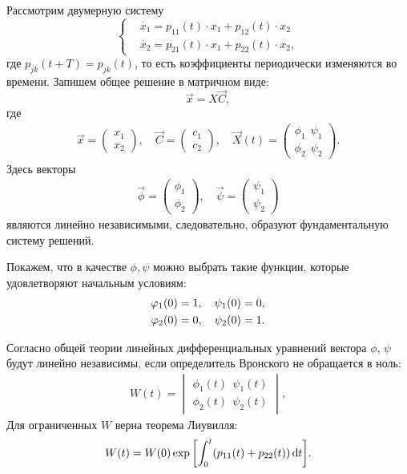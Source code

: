 Рассмотрим двумерную систему
\begin{equation}
	\left\{\begin{aligned}
		&\dot{x_1}=p_{11}(t)\cdot x_1+p_{12}(t)\cdot x_2 \\
		&\dot{x_2}=p_{21}(t)\cdot x_1+p_{22}(t)\cdot x_2,	
	\end{aligned}\right.
	\label{eq:47}
\end{equation}
где $p_{jk}(t+T)=p_{jk}(t)$, то есть  коэффициенты периодически изменяются во времени. Запишем общее решение в матричном виде:
\begin{equation*}
	\vec{x} = X \vec{C}, 
\end{equation*}
где
\begin{gather*}
	\vec{x}= 
	\begin{pmatrix}
		x_1 \\
		x_2
	\end{pmatrix}
	,\quad
	\vec{C}= 
	\begin{pmatrix}
		c_1 \\
		c_2
	\end{pmatrix}
	,\quad
	\vec{X}(t)= 
	\begin{pmatrix}
		\phi_1 ~~  \psi_1 \\
		\phi_2  ~~ \psi_2
	\end{pmatrix}.
\end{gather*}
Здесь векторы
\begin{gather*}
	\vec{\phi}= 
	\begin{pmatrix}
		\phi_1 \\
		\phi_2
	\end{pmatrix}
	,\quad
	\vec{\psi}= 
	\begin{pmatrix}
		\psi_1 \\
		\psi_2
	\end{pmatrix}
\end{gather*}
являются линейно независимыми, следовательно, образуют фундаментальную систему решений. 

Покажем, что в качестве $\phi,\psi$ можно выбрать такие функции, которые удовлетворяют начальным условиям:
\begin{gather}
	\phi_1(0)=1,\quad \psi_1(0)=0, \notag \\ 
	\phi_2(0)=0,\quad \psi_2(0)=1.		
	\label{eq:48}
\end{gather}

Согласно общей теории линейных дифференциальных уравнений вектора $\phi$, $\psi$  будут линейно независимы, если определитель Вронского не обращается в ноль:
\begin{gather*}
	W(t)= 
	\begin{vmatrix}
		\phi_1(t) ~~\psi_1(t) \\ 
		\phi_2(t) ~~\psi_2(t)
	\end{vmatrix}
	,
\end{gather*}
Для ограниченных $W$ верна теорема Лиувилля:
\begin{equation}
	W(t)=W(0)\exp\qty[\int_0^t(p_{11}(t)+p_{22}(t))\dd{t}].
	\label{eq:49}	
\end{equation}


